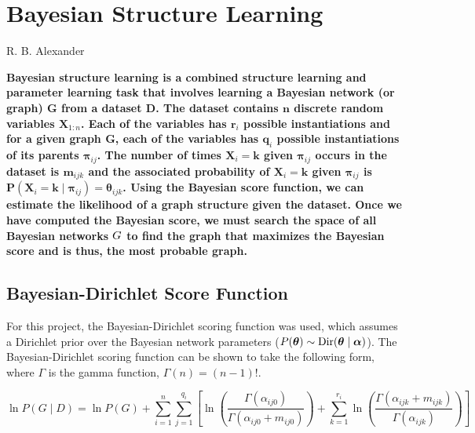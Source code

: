 \documentclass[10pt,letterpaper]{article}
\begin{document}
		
	
	\section*{\sf \textbf{Bayesian Structure Learning}}
	\vspace*{-0.1 in}
	{\noindent \sf \large R. B. Alexander}
	
	\vspace*{0.2 in}
	
	\noindent \textbf{Bayesian structure learning is a combined structure learning and parameter learning task that involves learning a Bayesian network (or graph) $\mathbf{G}$ from a dataset $\mathbf D$. The dataset contains $\mathbf n$ discrete random variables $\mathbf X_{1:n}$. Each of the variables has $\mathbf r_i$ possible instantiations and for a given graph $\mathbf G$, each of the variables has $\mathbf q_i$ possible instantiations of its parents $\boldsymbol \pi_{ij}$. The number of times $\mathbf X_i = \mathbf k$ given $\boldsymbol\pi_{ij}$ occurs in the dataset is $\mathbf m_{ijk}$ and the associated probability of $\mathbf X_i = \mathbf k$ given $\boldsymbol\pi_{ij}$ is $\mathbf P(\mathbf X_i = \mathbf{k} \mid \boldsymbol\pi_{ij}) = \boldsymbol\theta_{ijk}$. Using the Bayesian score function, we can estimate the likelihood of a graph structure given the dataset. Once we have computed the Bayesian score, we must search the space of all Bayesian networks $\mathbf \mathcal{G}$ to find the graph that maximizes the Bayesian score and is thus, the most probable graph.}
					
	\subsection*{\sf \textbf{Bayesian-Dirichlet Score Function}}
	
	For this project, the Bayesian-Dirichlet scoring function was used, which assumes a Dirichlet prior over the Bayesian network parameters ($P(\boldsymbol\theta) \sim \textnormal{Dir}(\boldsymbol\theta\mid\boldsymbol\alpha)$). The Bayesian-Dirichlet scoring function can be shown to take the following form, where $\Gamma$ is the gamma function, $\Gamma(n) = (n-1)!$.
	
	$$ \ln P(G \mid D) = \ln P(G) + \sum_{i=1}^n\sum_{j=1}^{q_i} \left[ \ln \left( \frac{\Gamma(\alpha_{ij0})}{\Gamma(\alpha_{ij0} + m_{ij0})} \right) + \sum_{k=1}^{r_i} \ln \left( \frac{\Gamma(\alpha_{ijk} + m_{ijk})}{\Gamma(\alpha_{ijk})} \right) \right]$$
	
\end{document}
